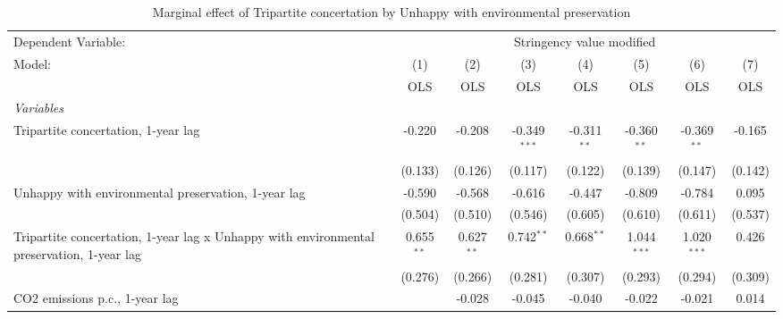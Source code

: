 
\begin{table}[htbp]
   \caption{Marginal effect of Tripartite concertation by Unhappy with environmental preservation}
   \centering
   \begin{tabular}{lccccccc}
      \toprule
      Dependent Variable: & \multicolumn{7}{c}{Stringency value modified}\\
      Model:                                                                                    & (1)          & (2)          & (3)            & (4)           & (5)           & (6)           & (7)\\  
                                                                                                &  OLS         & OLS          & OLS            & OLS           & OLS           & OLS           & OLS\\  
      \midrule
      \emph{Variables}\\
      Tripartite concertation, 1-year lag                                                       & -0.220       & -0.208       & -0.349$^{***}$ & -0.311$^{**}$ & -0.360$^{**}$ & -0.369$^{**}$ & -0.165\\   
                                                                                                & (0.133)      & (0.126)      & (0.117)        & (0.122)       & (0.139)       & (0.147)       & (0.142)\\   
      Unhappy with environmental preservation, 1-year lag                                       & -0.590       & -0.568       & -0.616         & -0.447        & -0.809        & -0.784        & 0.095\\   
                                                                                                & (0.504)      & (0.510)      & (0.546)        & (0.605)       & (0.610)       & (0.611)       & (0.537)\\   
      Tripartite concertation, 1-year lag x Unhappy with environmental preservation, 1-year lag & 0.655$^{**}$ & 0.627$^{**}$ & 0.742$^{**}$   & 0.668$^{**}$  & 1.044$^{***}$ & 1.020$^{***}$ & 0.426\\   
                                                                                                & (0.276)      & (0.266)      & (0.281)        & (0.307)       & (0.293)       & (0.294)       & (0.309)\\   
      CO2 emissions p.c., 1-year lag                                                            &              & -0.028       & -0.045         & -0.040        & -0.022        & -0.021        & 0.014\\   

\end{tabular}
\end{table}
